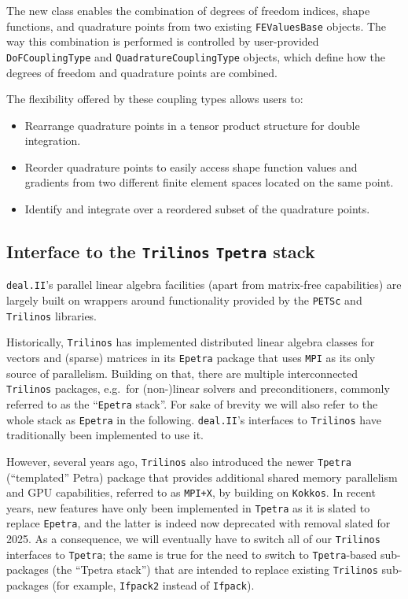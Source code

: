 \documentclass{ansarticle-preprint}
\newcommand{\specialword}[1]{\texttt{#1}}
\newcommand{\dealii}{{\specialword{deal.II}}\xspace}
\newcommand{\trilinos}{{\specialword{Trilinos}}\xspace}
\newcommand{\petsc}{\specialword{PETSc}\xspace}
\newcommand{\MPI}{{\specialword{MPI}}\xspace}
\newcommand{\MPIx}{{\specialword{MPI+X}}\xspace}
\newcommand{\kokkos}{{\specialword{Kokkos}}\xspace}
\newcommand{\epetra}{{\specialword{Epetra}}\xspace}
\newcommand{\tpetra}{{\specialword{Tpetra}}\xspace}
\begin{document}
\begin{itemize}
The new class enables the combination of degrees of freedom indices, shape
functions, and quadrature points from two existing \texttt{FEValuesBase}
objects. The way this combination is performed is controlled by user-provided
\texttt{DoFCouplingType} and \texttt{QuadratureCouplingType} objects, which
define how the degrees of freedom and quadrature points are combined.

The flexibility offered by these coupling types allows users to:

\begin{itemize}
 \item Rearrange quadrature points in a tensor product structure for double
integration.
\item Reorder quadrature points to easily access shape function values and
gradients from two different finite element spaces located on the same point.
\item Identify and integrate over a reordered subset of the quadrature points.
\end{itemize}
\end{itemize}

\subsection{Interface to the \trilinos{} \tpetra{} stack}\label{sec:tpetra}

\dealii{}'s parallel linear algebra facilities (apart from matrix-free capabilities) are largely built on
wrappers around functionality provided by the \petsc{} and \trilinos{} libraries.

Historically, \trilinos{} has implemented distributed linear algebra classes for vectors and (sparse) matrices in its
\epetra{} package that uses \MPI{} as its only source of
parallelism. Building on that, there are multiple interconnected \trilinos{} packages, e.g.\ for (non-)linear solvers 
and preconditioners, commonly referred to as the 
``\epetra{} stack''. For sake of brevity we will also refer to the whole stack as \epetra{} in the following.
\dealii{}'s interfaces to \trilinos{} have traditionally 
been implemented to use it.

However, several years ago, \trilinos{} also introduced the
newer \tpetra{} (``templated'' Petra) package that provides additional shared memory
parallelism and GPU capabilities, referred to as \MPIx, by building on \kokkos{}. 
In recent years, new features have only been implemented in \tpetra{} as 
it is slated to replace \epetra{}, and the latter is indeed
now deprecated with removal slated for 2025. 
As a consequence, 
we will eventually have to switch all of our \trilinos{} interfaces to \tpetra{}; 
the same is true for the need to switch to \tpetra{}-based
sub-packages (the ``Tpetra stack'') that are intended to replace existing \trilinos{} sub-packages 
(for example, \texttt{Ifpack2} instead of \texttt{Ifpack}).
\end{document}
